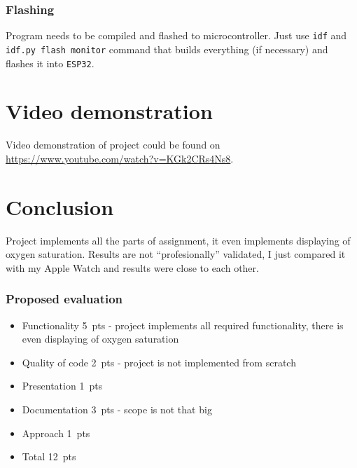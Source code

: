     \subsection{Flashing}
        Program needs to be compiled and flashed to microcontroller. Just use \texttt{idf} and \texttt{idf.py flash monitor} command that builds everything (if necessary) and flashes it into \texttt{ESP32}.

\chapter{Video demonstration}
    Video demonstration of project could be found on \\ \href{https://www.youtube.com/watch?v=KGk2CRs4Ns8}{https://www.youtube.com/watch?v=KGk2CRs4Ns8}.
        
\chapter{Conclusion}
    Project implements all the parts of assignment, it even implements displaying of oxygen saturation. Results are not ``profesionally'' validated, I just compared it with my Apple Watch and results were close to each other.

    \subsection{Proposed evaluation}
        \begin{itemize}
            \item Functionality 5\ pts - project implements all required functionality, there is even displaying of oxygen saturation
            \item Quality of code 2\ pts - project is not implemented from scratch
            \item Presentation 1\ pts
            \item Documentation 3\ pts - scope is not that big
            \item Approach 1\ pts
            \item Total 12\ pts
        \end{itemize}
